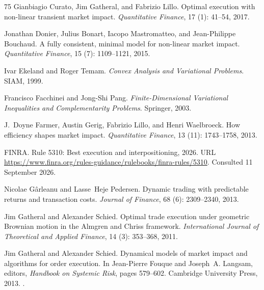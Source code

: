 \documentclass[11pt]{article}
\numberwithin{equation}{section}
\theoremstyle{definition}
\theoremstyle{remark}
\theoremstyle{definition}
\begin{document}
\begin{thebibliography}{75}
Gianbiagio Curato, Jim Gatheral, and Fabrizio Lillo.
\newblock Optimal execution with non-linear transient market impact.
\newblock \emph{Quantitative Finance}, 17 (1): 41--54, 2017.

Jonathan Donier, Julius Bonart, Iacopo Mastromatteo, and Jean-Philippe
  Bouchaud.
\newblock A fully consistent, minimal model for non-linear market impact.
\newblock \emph{Quantitative Finance}, 15 (7): 1109--1121,
  2015.

Ivar Ekeland and Roger Temam.
\newblock \emph{Convex Analysis and Variational Problems}.
\newblock SIAM, 1999.

Francisco Facchinei and Jong-Shi Pang.
\newblock \emph{Finite-Dimensional Variational Inequalities and Complementarity
  Problems}.
\newblock Springer, 2003.

J.~Doyne Farmer, Austin Gerig, Fabrizio Lillo, and Henri Waelbroeck.
\newblock How efficiency shapes market impact.
\newblock \emph{Quantitative Finance}, 13 (11): 1743--1758,
  2013.

{FINRA}.
\newblock Rule 5310: Best execution and interpositioning, 2026.
\newblock URL
  \url{https://www.finra.org/rules-guidance/rulebooks/finra-rules/5310}.
\newblock Consulted 11 September 2026.

Nicolae G{\^a}rleanu and Lasse~Heje Pedersen.
\newblock Dynamic trading with predictable returns and transaction costs.
\newblock \emph{Journal of Finance}, 68 (6): 2309--2340,
  2013.

Jim Gatheral and Alexander Schied.
\newblock Optimal trade execution under geometric {B}rownian motion in the
  {A}lmgren and {C}hriss framework.
\newblock \emph{International Journal of Theoretical and Applied Finance},
  14 (3): 353--368, 2011.

Jim Gatheral and Alexander Schied.
\newblock Dynamical models of market impact and algorithms for order execution.
\newblock In Jean-Pierre Fouque and Joseph~A. Langsam, editors, \emph{Handbook
  on Systemic Risk}, pages 579--602. Cambridge University Press, 2013.
\newblock {}.


\end{thebibliography}
\end{document}

